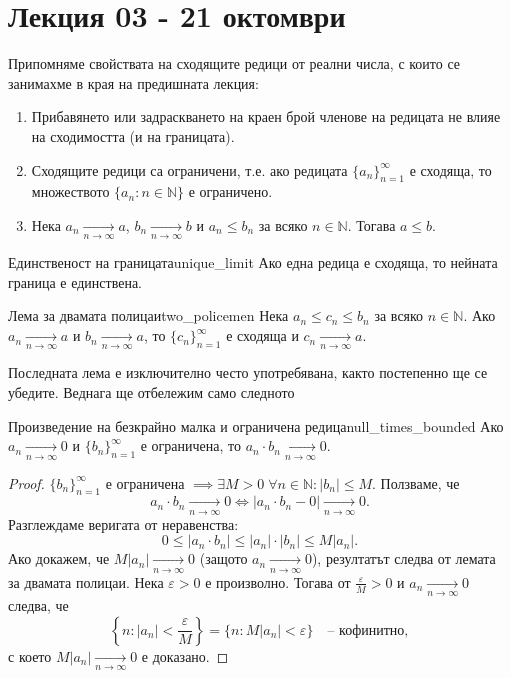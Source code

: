 \section*{Лекция 03 - 21 октомври}

Припомняме свойствата на сходящите редици от реални числа, с които се занимахме в края на предишната лекция:

\begin{enumerate}
    \item Прибавянето или задраскването на краен брой членове на редицата не влияе на сходимостта (и на границата).
    \item Сходящите редици са ограничени, т.е. ако редицата $\{a_n\}_{n=1}^{\infty}$ е сходяща, то множеството $\{a_n : n \in \mathbb{N}\}$ е ограничено.
    \item Нека $a_n \xrightarrow[n\to\infty]{} a$, $b_n \xrightarrow[n\to\infty]{} b$ и $a_n \le b_n$ за всяко $n \in \mathbb{N}$. Тогава $a \le b$.
\end{enumerate}

\begin{corollary}{Единственост на границата}{unique_limit}
Ако една редица е сходяща, то нейната граница е единствена.
\end{corollary}

\begin{lemma}{Лема за двамата полицаи}{two_policemen}
Нека $a_n \le c_n \le b_n$ за всяко $n \in \mathbb{N}$. Ако $a_n \xrightarrow[n\to\infty]{} a$ и $b_n \xrightarrow[n\to\infty]{} a$, то $\{c_n\}_{n=1}^{\infty}$ е сходяща и $c_n \xrightarrow[n\to\infty]{} a$.
\end{lemma}

Последната лема е изключително често употребявана, както постепенно ще се убедите. Веднага ще отбележим само следното

\begin{corollary}{Произведение на безкрайно малка и ограничена редица}{null_times_bounded}
Ако $a_n \xrightarrow[n\to\infty]{} 0$ и $\{b_n\}_{n=1}^{\infty}$ е ограничена, то $a_n \cdot b_n \xrightarrow[n\to\infty]{} 0$.
\end{corollary}

\begin{proof}
$\{b_n\}_{n=1}^{\infty}$ е ограничена $\implies \exists M > 0 \; \forall n \in \mathbb{N} : |b_n| \le M$. Ползваме, че
\[
a_n \cdot b_n \xrightarrow[n\to\infty]{} 0 \iff |a_n \cdot b_n - 0| \xrightarrow[n\to\infty]{} 0.
\]
Разглеждаме веригата от неравенства:
\[
0 \le |a_n \cdot b_n| \le |a_n| \cdot |b_n| \le M|a_n|.
\]
Ако докажем, че $M|a_n| \xrightarrow[n\to\infty]{} 0$ (защото $a_n \xrightarrow[n\to\infty]{} 0$), резултатът следва от лемата за двамата полицаи. Нека $\varepsilon > 0$ е произволно. Тогава от $\frac{\varepsilon}{M} > 0$ и $a_n \xrightarrow[n\to\infty]{} 0$ следва, че
\[
\left\{n : |a_n| < \frac{\varepsilon}{M}\right\} = \{n : M|a_n| < \varepsilon\} \quad \text{-- кофинитно},
\]
с което $M|a_n| \xrightarrow[n\to\infty]{} 0$ е доказано.
\end{proof}

